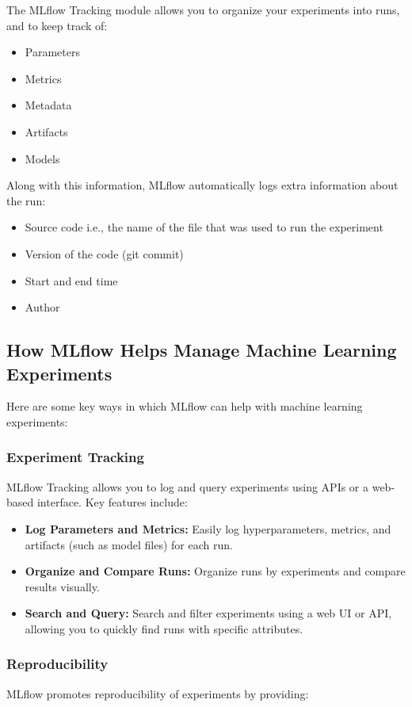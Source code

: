 \documentclass[letterpaper,12pt,notitlepage,twoside]{report}
\begin{document}
The MLflow Tracking module allows you to organize your experiments into runs, and to keep track of:
\begin{itemize}[noitemsep, topsep=0pt]
	\item Parameters
	\item Metrics
	\item Metadata
	\item Artifacts
	\item Models
\end{itemize}

Along with this information, MLflow automatically logs extra information about the run:
\begin{itemize}[noitemsep, topsep=0pt]
	\item Source code i.e., the name of the file that was used to run the experiment
	\item Version of the code (git commit)
	\item Start and end time
	\item Author
\end{itemize}

\subsection{How MLflow Helps Manage Machine Learning Experiments}
Here are some key ways in which MLflow can help with machine learning experiments:
\subsubsection{Experiment Tracking}
MLflow Tracking allows you to log and query experiments using APIs or a web-based interface. Key features include:

\begin{itemize}
    \item \textbf{Log Parameters and Metrics:} Easily log hyperparameters, metrics, and artifacts (such as model files) for each run.
    \item \textbf{Organize and Compare Runs:} Organize runs by experiments and compare results visually.
    \item \textbf{Search and Query:} Search and filter experiments using a web UI or API, allowing you to quickly find runs with specific attributes.
\end{itemize}

\subsubsection{Reproducibility}
MLflow promotes reproducibility of experiments by providing:
\end{document}
